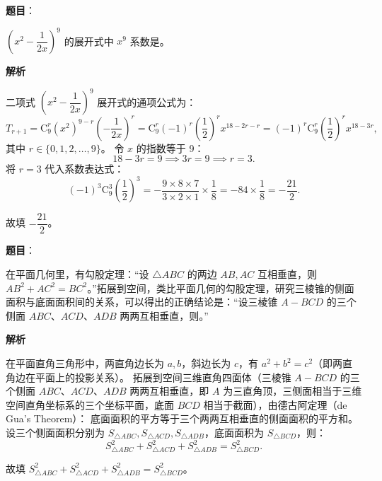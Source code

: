 \begin{answer}

\textbf{题目}：

$\left(x^2 - \dfrac{1}{2x}\right)^9$ 的展开式中 $x^9$ 系数是\gkblank{}。

\textbf{解析}

二项式 $\left(x^2 - \dfrac{1}{2x}\right)^9$ 展开式的通项公式为：
\nopagebreak[4]
\[T_{r+1} = \mathrm{C}_9^r (x^2)^{9-r} \left(-\frac{1}{2x}\right)^r = \mathrm{C}_9^r (-1)^r \left(\frac{1}{2}\right)^r x^{18 - 2r - r} = (-1)^r \mathrm{C}_9^r \left(\frac{1}{2}\right)^r x^{18 - 3r},\]
其中 $r \in \{0, 1, 2, \dots, 9\}$。
令 $x$ 的指数等于 9：
\nopagebreak[4]
\[18 - 3r = 9 \implies 3r = 9 \implies r = 3.\]
将 $r = 3$ 代入系数表达式：
\nopagebreak[4]
\[(-1)^3 \mathrm{C}_9^3 \left(\frac{1}{2}\right)^3 = - \frac{9 \times 8 \times 7}{3 \times 2 \times 1} \times \frac{1}{8} = - 84 \times \frac{1}{8} = -\frac{21}{2}.\]

故填 $-\dfrac{21}{2}$。


\end{answer}
\begin{answer}

\textbf{题目}：

在平面几何里，有勾股定理：“设 $\triangle ABC$ 的两边 $AB, AC$ 互相垂直，则 $AB^2 + AC^2 = BC^2$。”拓展到空间，类比平面几何的勾股定理，研究三棱锥的侧面面积与底面面积间的关系，可以得出的正确结论是：“设三棱锥 $A-BCD$ 的三个侧面 $ABC$、$ACD$、$ADB$ 两两互相垂直，则\gkblank{}。”

\textbf{解析}

在平面直角三角形中，两直角边长为 $a, b$，斜边长为 $c$，有 $a^2 + b^2 = c^2$（即两直角边在平面上的投影关系）。
拓展到空间三维直角四面体（三棱锥 $A-BCD$ 的三个侧面 $ABC$、$ACD$、$ADB$ 两两互相垂直，即 $A$ 为三直角顶，三侧面相当于三维空间直角坐标系的三个坐标平面，底面 $BCD$ 相当于截面），由德古阿定理（de Gua's Theorem）：
底面面积的平方等于三个两两互相垂直的侧面面积的平方和。
设三个侧面面积分别为 $S_{\triangle ABC}, S_{\triangle ACD}, S_{\triangle ADB}$，底面面积为 $S_{\triangle BCD}$，则：
\nopagebreak[4]
\[S_{\triangle ABC}^2 + S_{\triangle ACD}^2 + S_{\triangle ADB}^2 = S_{\triangle BCD}^2.\]

故填 $S_{\triangle ABC}^2 + S_{\triangle ACD}^2 + S_{\triangle ADB}^2 = S_{\triangle BCD}^2$。


\end{answer}

